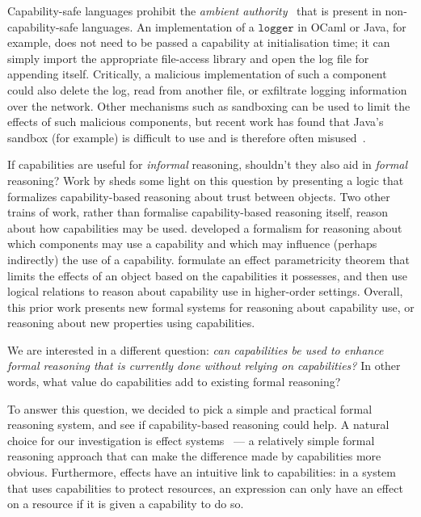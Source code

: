 \documentclass[sigplan,10pt]{acmart}\settopmatter{}
\newcommand{\kwat}[1]{$\kwa{#1}$}
\newcommand{\kwa}[1]{\mathtt{#1}}
\begin{document}
Capability-safe languages prohibit the \textit{ambient authority}~\cite{miller06} that is present in non-capability-safe languages.
An implementation of a \kwat{logger} in OCaml or Java, for example, does not need to be passed a capability at initialisation time; it can simply import the appropriate file-access library and open the log file for appending itself.
Critically, a malicious implementation of such a component could also delete the log, read from another file, or exfiltrate logging information over the network.
Other mechanisms such as sandboxing can be used to limit the effects of such malicious components, but recent work has found that Java's sandbox (for example) is difficult to use and is therefore often misused~\cite{coker15}. %


If capabilities are useful for \textit{informal} reasoning, shouldn't they also aid in \textit{formal} reasoning?
Work by \citet{drossopoulou07} sheds some light on this question by presenting a logic that formalizes capability-based reasoning about trust between objects.
Two other trains of work, rather than formalise capability-based reasoning itself, reason about how capabilities may be used.
\citet{dimoulas14} developed a formalism for reasoning about which components may use a capability and which may influence (perhaps indirectly) the use of a capability.
\citet{devriese16} formulate an effect parametricity theorem that limits the effects of an object based on the capabilities it possesses, and then use logical relations to reason about capability use in higher-order settings.
Overall, this prior work presents new formal systems for reasoning about capability use, or reasoning about new properties using capabilities.

We are interested in a different question: \textit{can capabilities be used to enhance formal reasoning that is currently done without relying on capabilities?}
In other words, what value do capabilities add to existing formal reasoning?

To answer this question, we decided to pick a simple and practical formal reasoning system, and see if capability-based reasoning could help.
A natural choice for our investigation is effect systems~\cite{nielson99} --- a relatively simple formal reasoning approach that can make the difference made by capabilities more obvious.
Furthermore, effects have an intuitive link to capabilities: in a system that uses capabilities to protect resources, an expression can only have an effect on a resource if it is given a capability to do so.
\end{document}
